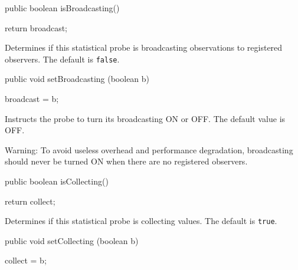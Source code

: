 \begin{htmlonly}
\end{htmlonly}
\begin{code}

   public boolean isBroadcasting()\begin{hide} {
      return broadcast;
   }\end{hide}
\end{code}
\begin{tabb}   Determines if this statistical probe
 is broadcasting observations to registered observers.
 The default is \texttt{false}.
\end{tabb}
\begin{htmlonly}
\end{htmlonly}
\begin{code}

   public void setBroadcasting (boolean b)\begin{hide} {
      broadcast = b;
   }\end{hide}
\end{code}
\begin{tabb}  Instructs the probe to turn its broadcasting ON or OFF.
  The default value is OFF.

  Warning: To avoid useless overhead and performance degradation, broadcasting
  should never be turned ON when there are no registered observers.
\end{tabb}
\begin{htmlonly}
\end{htmlonly}
\begin{code}

   public boolean isCollecting()\begin{hide} {
      return collect;
   }\end{hide}
\end{code}
\begin{tabb}   Determines if this statistical probe
 is collecting values. The default is \texttt{true}.
\end{tabb}
\begin{htmlonly}
\end{htmlonly}
\begin{code}

   public void setCollecting (boolean b)\begin{hide} {
      collect = b;
   }\end{hide}
\end{code}
